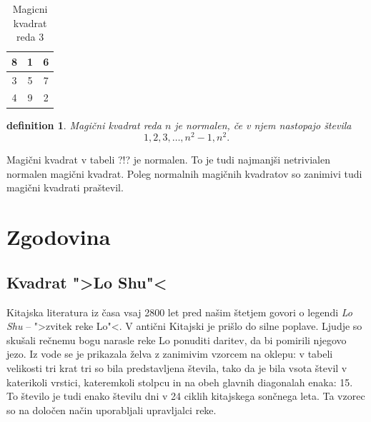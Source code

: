 \documentclass[a4paper,12pt]{article}
\newtheorem{definition}{definition}
\begin{document}
\begin{table}[h!]
   \centering
   \caption{Magicni kvadrat reda 3}
   \label{table:mag3}
   \begin{tabular}{|c|c|c|}
      \hline
      8 & 1 & 6 \\\hline
      3 & 5 & 7 \\\hline
      4 & 9 & 2 \\\hline
      
   \end{tabular}
\end{table}

\begin{definition}
   Magični kvadrat reda $n$ je \emph{normalen}, če v njem nastopajo števila
   \begin{equation}
      1, 2, 3, \ldots, n^2-1, n^2.
   \end{equation}
\end{definition}

Magični kvadrat v tabeli ?!? je normalen.
To je tudi najmanjši netrivialen normalen magični kvadrat.
Poleg normalnih magičnih kvadratov so zanimivi tudi magični kvadrati praštevil.


\section{Zgodovina}

\subsection{Kvadrat ">Lo Shu"<}

Kitajska literatura iz časa vsaj 2800 let pred našim štetjem govori o legendi
\emph{Lo Shu} -- ">zvitek reke Lo"<. V antični Kitajski je prišlo do
silne poplave. Ljudje so skušali rečnemu bogu narasle reke Lo ponuditi daritev,
da bi pomirili njegovo jezo. Iz vode se je prikazala želva z zanimivim vzorcem
na oklepu: v tabeli velikosti tri krat tri so bila predstavljena števila, tako
da je bila vsota števil v katerikoli vrstici, kateremkoli stolpcu in na obeh
glavnih diagonalah enaka: 15. To število je tudi enako številu dni v 24 ciklih
kitajskega sončnega leta. Ta vzorec so na določen način uporabljali upravljalci
reke.
\end{document}
